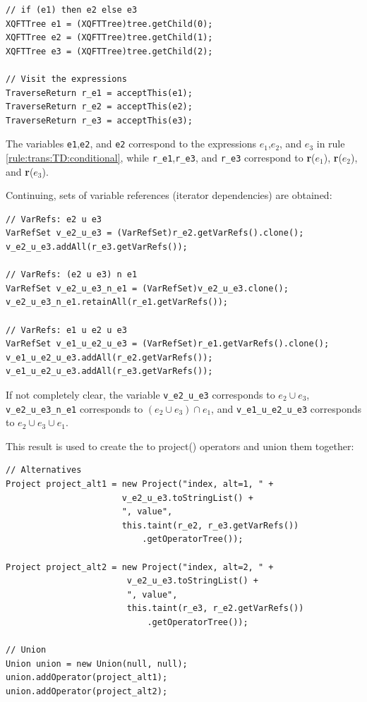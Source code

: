 \begin{Verbatim}
// if (e1) then e2 else e3
XQFTTree e1 = (XQFTTree)tree.getChild(0); 
XQFTTree e2 = (XQFTTree)tree.getChild(1);
XQFTTree e3 = (XQFTTree)tree.getChild(2);
        
// Visit the expressions
TraverseReturn r_e1 = acceptThis(e1);
TraverseReturn r_e2 = acceptThis(e2);
TraverseReturn r_e3 = acceptThis(e3);
\end{Verbatim}

The variables \texttt{e1},\texttt{e2}, and \texttt{e2} correspond to the
expressions $e_1$,$e_2$, and $e_3$ in rule \ref{rule:trans:TD:conditional},
while \texttt{r\_e1},\texttt{r\_e3}, and \texttt{r\_e3} correspond to
\textbf{r}($e_1$), \textbf{r}($e_2$), and \textbf{r}($e_3$).

Continuing, sets of variable references (iterator dependencies) are obtained:
         
\begin{Verbatim}
// VarRefs: e2 u e3
VarRefSet v_e2_u_e3 = (VarRefSet)r_e2.getVarRefs().clone();
v_e2_u_e3.addAll(r_e3.getVarRefs());

// VarRefs: (e2 u e3) n e1
VarRefSet v_e2_u_e3_n_e1 = (VarRefSet)v_e2_u_e3.clone();
v_e2_u_e3_n_e1.retainAll(r_e1.getVarRefs());

// VarRefs: e1 u e2 u e3
VarRefSet v_e1_u_e2_u_e3 = (VarRefSet)r_e1.getVarRefs().clone();
v_e1_u_e2_u_e3.addAll(r_e2.getVarRefs());
v_e1_u_e2_u_e3.addAll(r_e3.getVarRefs());
\end{Verbatim}

If not completely clear, the variable \texttt{v\_e2\_u\_e3} corresponds to
$e_2 \cup e_3$, \texttt{v\_e2\_u\_e3\_n\_e1} corresponds to $(e_2 \cup e_3) \cap
e_1$, and \texttt{v\_e1\_u\_e2\_u\_e3} corresponds to $e_2 \cup e_3 \cup
e_1$.

This result is used to create the to \textsf{project()} operators and union
them together:

\begin{Verbatim}
// Alternatives
Project project_alt1 = new Project("index, alt=1, " + 
                       v_e2_u_e3.toStringList() + 
                       ", value", 
                       this.taint(r_e2, r_e3.getVarRefs())
                           .getOperatorTree()); 

Project project_alt2 = new Project("index, alt=2, " +
                        v_e2_u_e3.toStringList() + 
                        ", value", 
                        this.taint(r_e3, r_e2.getVarRefs())
                            .getOperatorTree()); 

// Union
Union union = new Union(null, null);
union.addOperator(project_alt1);
union.addOperator(project_alt2);
\end{Verbatim}

